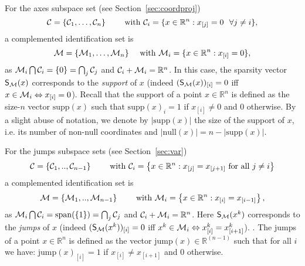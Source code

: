 \begin{example}\label{ex:supp}
For the axes subspace set (see Section~\ref{sec:coordproj})
\begin{equation}\label{eq:Ccoord}
    \mathcal{C} = \{\mathcal{C}_1,\ldots,\mathcal{C}_n\} \qquad\text{ with } \mathcal{C}_i = \{x\in\mathbb{R}^n  : x_{[j]} = 0 ~~ \forall j \neq i \},
\end{equation}
a {complemented} identification set is 
\begin{equation}\label{eq:Mcoord}
    \mathcal{M} = \{\mathcal{M}_1,\ldots,\mathcal{M}_n\} \quad\text{ with } \mathcal{M}_i = \{x\in\mathbb{R}^n  : x_{[i]} = 0 \}, 
\end{equation} 
as $\mathcal{M}_i \bigcap \mathcal{C}_i = \{0\} = \bigcap_j \mathcal{C}_j$ and $\mathcal{C}_i+\mathcal{M}_i = \mathbb{R}^n$. 
{In this case, the sparsity vector $\mathsf{S}_{\mathcal{M}}(x)$ corresponds to the \emph{support} of $x$ (indeed $(\mathsf{S}_{\mathcal{M}}(x))_{[i]} = 0$ iff $x \in \mathcal{M}_i \Leftrightarrow x_{[i]}=0$). Recall that the support of a point $x\in\mathbb{R}^n$ is defined as the size-$n$ vector $\mathrm{supp}(x)$ such that $\mathrm{supp}(x)_i = 1$ if $x_{[i]}\neq 0$ and $0$ otherwise. By a slight abuse of notation, we denote by $|\mathrm{supp}(x)|$ the size of the support of $x$, i.e. its number of non-null coordinates and $|\mathrm{null}(x)| = n - |\mathrm{supp}(x)|$.}

For the jumps subspace sets (see Section~\ref{sec:var})
\begin{equation}\label{eq:Cjump}
    \mathcal{C} = \{\mathcal{C}_1,..,\mathcal{C}_{n-1}\} \qquad\text{ with } \mathcal{C}_i = \left\{x\in\mathbb{R}^n  : 
x_{[j]} = x_{[j+1]} \text{ for all $j\neq i$} \right\}
\end{equation}  
a  {complemented} identification set is 
\begin{equation}\label{eq:Mjump}
\mathcal{M} = \{\mathcal{M}_1,..,\mathcal{M}_{n-1} \} \qquad\text{ with } \mathcal{M}_i = \left\{x\in\mathbb{R}^n  :  x_{[i]} = x_{[i-1]} \right\},    
\end{equation}
as $\mathcal{M}_i \bigcap \mathcal{C}_i = \mathrm{span}(\{1\}) = \bigcap_j \mathcal{C}_j$ and $\mathcal{C}_i+\mathcal{M}_i = \mathbb{R}^n$. {Here $\mathsf{S}_{\mathcal{M}}(x^{k})$ corresponds to the \emph{jumps} of $x$ (indeed $(\mathsf{S}_{\mathcal{M}}(x^k))_{[i]} = 0$ iff $x^k \in \mathcal{M}_i \Leftrightarrow x_{[i]}^k=x_{[i+1]}^k$). . The jumps of a point $x\in\mathbb{R}^n$ is defined as the vector $\mathrm{jump}(x)\in \mathbb{R}^{(n-1)}$ such that for all $i$ we have: $\mathrm{jump}(x)_{[i]} = 1$ if $x_{[i]}\neq x_{[i+1]}$ and $0$ otherwise.}
\end{example}

